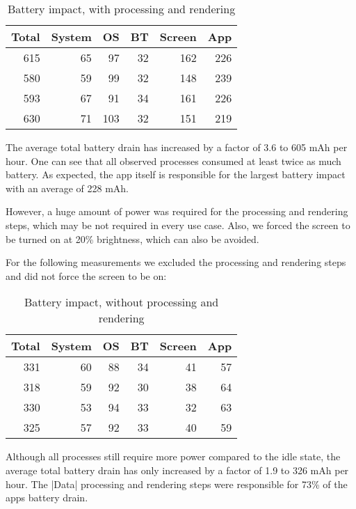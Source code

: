 \begin{table}[H]
    \centering
    \begin{tabular}{rrrrrr}
        Total    & System   & OS       & BT       & Screen   & App  \\ \hline

        615      & 65       & 97       & 32       & 162      & 226  \\
        580      & 59       & 99       & 32       & 148      & 239  \\
        593      & 67       & 91       & 34       & 161      & 226  \\
        630      & 71       & 103      & 32       & 151      & 219  \\
    \end{tabular}
    \caption{Battery impact, with processing and rendering}
    \label{table:benchmark:battery:screen}
\end{table}

The average total battery drain has increased by a factor of 3.6 to 605 mAh per hour.
One can see that all observed processes consumed at least twice as much battery.
As expected, the app itself is responsible for the largest battery impact with an average of 228 mAh.

However, a huge amount of power was required for the processing and rendering steps, which may be not required in every use case.
Also, we forced the screen to be turned on at 20\% brightness, which can also be avoided.

For the following measurements we excluded the processing and rendering steps and did not force the screen to be on:

\begin{table}[H]
    \centering
    \begin{tabular}{rrrrrr}
        Total    & System   & OS       & BT       & Screen   & App  \\ \hline

        331      & 60       & 88       & 34       & 41       & 57   \\
        318      & 59       & 92       & 30       & 38       & 64   \\
        330      & 53       & 94       & 33       & 32       & 63   \\
        325      & 57       & 92       & 33       & 40       & 59   \\
    \end{tabular}
    \caption{Battery impact, without processing and rendering}
    \label{table:benchmark:battery:noscreen}
\end{table}

Although all processes still require more power compared to the idle state, the average total battery drain has only increased by a factor of 1.9 to 326 mAh per hour.
The |Data| processing and rendering steps were responsible for 73\% of the apps battery drain.


\clearpage